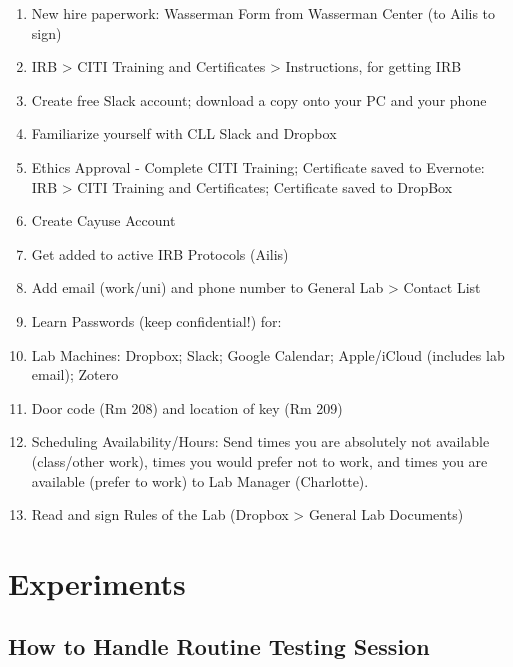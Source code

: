 \documentclass[
]{book}
\providecommand{\tightlist}{%
  \setlength{\itemsep}{0pt}\setlength{\parskip}{0pt}}
\begin{document}
\begin{enumerate}
\def\labelenumi{\arabic{enumi}.}
\tightlist
\item
  New hire paperwork: Wasserman Form from Wasserman Center (to Ailis to sign)
\item
  IRB \textgreater{} CITI Training and Certificates \textgreater{} Instructions, for getting IRB
\item
  Create free Slack account; download a copy onto your PC and your phone
\item
  Familiarize yourself with CLL Slack and Dropbox
\item
  Ethics Approval - Complete CITI Training; Certificate saved to Evernote: IRB \textgreater{} CITI Training and Certificates; Certificate saved to DropBox
\item
  Create Cayuse Account
\item
  Get added to active IRB Protocols (Ailis)
\item
  Add email (work/uni) and phone number to General Lab \textgreater{} Contact List
\item
  Learn Passwords (keep confidential!) for:
\item
  Lab Machines: Dropbox; Slack; Google Calendar; Apple/iCloud (includes lab email); Zotero
\item
  Door code (Rm 208) and location of key (Rm 209)
\item
  Scheduling Availability/Hours: Send times you are absolutely not available (class/other work), times you would prefer not to work, and times you are available (prefer to work) to Lab Manager (Charlotte).\\
\item
  Read and sign Rules of the Lab (Dropbox \textgreater{} General Lab Documents)
\end{enumerate}

\hypertarget{experiments}{%
\chapter{Experiments}\label{experiments}}

\hypertarget{how-to-handle-routine-testing-session}{%
\section{How to Handle Routine Testing Session}\label{how-to-handle-routine-testing-session}}
\end{document}

